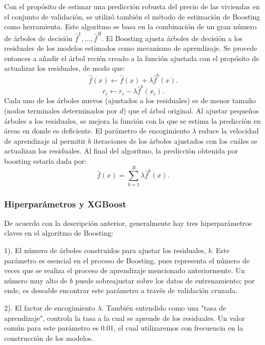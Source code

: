 \documentclass[article,11 pt]{article}
\begin{document}
Con el propósito de estimar una predicción robusta del precio de las viviendas en el conjunto de validación, se utilizó también el método de estimación de Boosting como herramienta. Este algoritmo se basa en la combinación de un gran número de árboles de decisión $\hat{f}^{1}, \ldots, \hat{f}^{B}.$ El Boosting ajusta árboles de decisión a los residuales de los modelos estimados como mecanismo de aprendizaje. Se procede entonces a añadir el árbol recién creado a la función ajustada con el propósito de actualizar los residuales, de modo que: \[\hat{f}(x) \leftarrow \hat{f}(x) + \lambda \hat{f}^{b}(x).\]
\[
r_i \leftarrow r_i - \lambda \hat{f}^{b}(x_i).
\]
Cada uno de los árboles nuevos (ajustados a los residuales) es de menor tamaño (nodos terminales determinados por $d$) que el árbol original. Al ajustar pequeños árboles a los residuales, se mejora la función con la que se estima la predicción en áreas en donde es deficiente. El parámetro de encogimiento $\lambda$ reduce la velocidad de aprendizaje al permitir $b$ iteraciones de los árboles ajustados con los cuáles se actualizan los residuales. Al final del algoritmo, la predicción obtenida por boosting estaría dada por:
\[
\hat{f}(x) = \sum_{b=1}^{B} \lambda \hat{f}^{b}(x).
\]

\subsubsection{Hiperparámetros y XGBoost}

De acuerdo con la descripción anterior, generalmente hay tres hiperparámetros claves en el algoritmo de Boosting: 

1). El número de árboles construidos para ajustar los residuales, $b$. Este parámetro es esencial en el proceso de Boosting, pues representa el número de veces que se realiza el proceso de aprendizaje mencionado anteriormente. Un número muy alto de $b$ puede sobreajustar sobre los datos de entrenamiento; por ende, es deseable encontrar este parámetro a través de validación cruzada.

2). El factor de encogimiento $\lambda$. También entendido como una "tasa de aprendizaje", controla la tasa a la cual se aprende de los residuales. Un valor común para este parámetro es 0.01, el cual utilizaremos con frecuencia en la construcción de los modelos.
\end{document}
